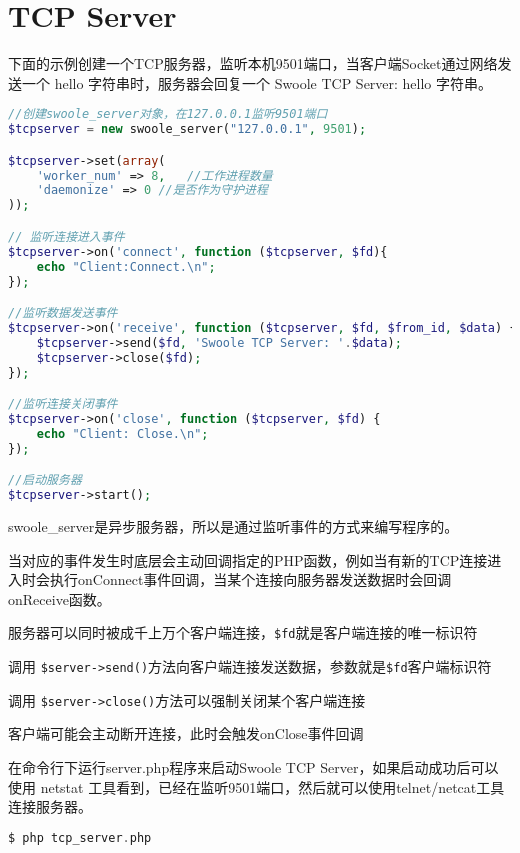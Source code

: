 \clearpage

\section{TCP Server}


下面的示例创建一个TCP服务器，监听本机9501端口，当客户端Socket通过网络发送一个 hello 字符串时，服务器会回复一个 Swoole TCP Server: hello 字符串。


\begin{lstlisting}[language=PHP]
//创建swoole_server对象，在127.0.0.1监听9501端口
$tcpserver = new swoole_server("127.0.0.1", 9501);

$tcpserver->set(array(
    'worker_num' => 8,   //工作进程数量
    'daemonize' => 0 //是否作为守护进程
));

// 监听连接进入事件
$tcpserver->on('connect', function ($tcpserver, $fd){
    echo "Client:Connect.\n";
});

//监听数据发送事件
$tcpserver->on('receive', function ($tcpserver, $fd, $from_id, $data) {
    $tcpserver->send($fd, 'Swoole TCP Server: '.$data);
    $tcpserver->close($fd);
});

//监听连接关闭事件
$tcpserver->on('close', function ($tcpserver, $fd) {
    echo "Client: Close.\n";
});

//启动服务器
$tcpserver->start();
\end{lstlisting}

swoole\_server是异步服务器，所以是通过监听事件的方式来编写程序的。

当对应的事件发生时底层会主动回调指定的PHP函数，例如当有新的TCP连接进入时会执行onConnect事件回调，当某个连接向服务器发送数据时会回调onReceive函数。

\begin{compactitem}
\item 服务器可以同时被成千上万个客户端连接，\texttt{\$fd}就是客户端连接的唯一标识符
\item 调用 \texttt{\$server->send()}方法向客户端连接发送数据，参数就是\texttt{\$fd}客户端标识符
\item 调用 \texttt{\$server->close()}方法可以强制关闭某个客户端连接
\item 客户端可能会主动断开连接，此时会触发onClose事件回调
\end{compactitem}

在命令行下运行server.php程序来启动Swoole TCP Server，如果启动成功后可以使用 netstat 工具看到，已经在监听9501端口，然后就可以使用telnet/netcat工具连接服务器。

\begin{lstlisting}[language=PHP]
$ php tcp_server.php 
\end{lstlisting}


